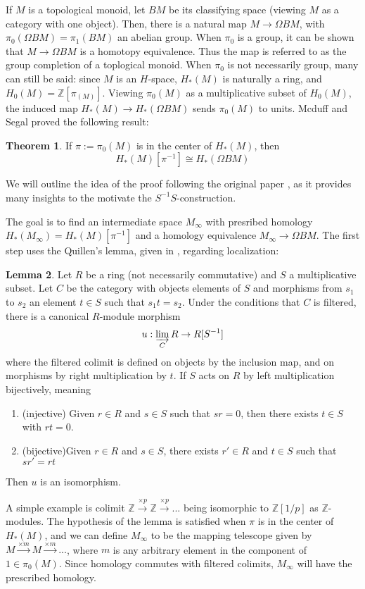 \documentclass{article}
\theoremstyle{definition}
\newtheorem{theorem}{Theorem}[section]
\theoremstyle{definition}
\theoremstyle{definition}
\theoremstyle{definition}
\theoremstyle{definition}
\newtheorem{lemma}[theorem]{Lemma}
\theoremstyle{definition}
\theoremstyle{definition}
\begin{document}
If $M$ is a topological monoid, let $BM$ be its classifying space (viewing $M$ as a category with one object). Then, there is a natural map $M\to \Omega BM$, with $\pi_0(\Omega BM)=\pi_1(BM)$ an abelian group. When $\pi_0$ is a group, it can be shown that $M\to \Omega BM$ is a homotopy equivalence. Thus the map is referred to as the group completion of a toplogical monoid. When $\pi_0$ is not necessarily group, many can still be said: since $M$ is an $H$-space, $H_*(M)$ is naturally a ring, and $H_0(M)=\mathbb{Z}[\pi_(M)]$. Viewing $\pi_0(M)$ as a multiplicative subset of $H_0(M)$, the induced map $H_*(M)\to H_*(\Omega BM)$ sends $\pi_0(M)$ to units. Mcduff and Segal proved the following result:


\begin{tcolorbox}[colback=red!5!white,colframe=red!30!white]
\begin{theorem}
If $\pi:=\pi_0(M)$ is in the center of $H_*(M)$, then 
\[H_*(M)[\pi^{-1}]\cong H_*(\Omega BM)\]
\end{theorem}
\end{tcolorbox}
We will outline the idea of the proof following the original paper \cite{MS}, as it provides many insights to the motivate the $S^{-1}S$-construction.

The goal is to  find an intermediate space $M_{\infty}$ with presribed homology $H_*(M_{\infty})= H_*(M)[\pi^{-1}]$ and a homology equivalence $M_{\infty}\to \Omega BM$. The first step uses the Quillen's lemma, given in \cite{QGc}, regarding localization:

\begin{tcolorbox}
\begin{lemma}
Let $R$ be a ring (not necessarily commutative) and $S$ a multiplicative subset. Let $C$ be the category with objects elements of $S$ and morphisms from $s_1$ to $s_2$ an element $t\in S$ such that $s_1t=s_2$. Under the conditions that $C$ is filtered, there is a canonical $R$-module morphism 
\[u:\varinjlim_{C} R \to R[S^{-1}] \]
where the filtered colimit is defined on objects by the inclusion map, and on morphisms by right multiplication by $t$. If $S$ acts on $R$ by left multiplication bijectively, meaning
\begin{enumerate}
    \item (injective) Given $r\in R$ and $s\in S$ such that $sr=0$, then there exists $t\in S$ with $rt=0$.
    \item (bijective)Given $r\in R$ and $s\in S$, there exists $r'\in R$ and $t\in S$ such that $sr'=rt$
\end{enumerate}
Then $u$ is an isomorphism. 
\end{lemma}
\end{tcolorbox}
A simple example is colimit $\mathbb{Z}\xrightarrow{\times p}\mathbb{Z}\xrightarrow{\times p}...$ being isomorphic to $\mathbb{Z}[1/p]$ as $\mathbb{Z}$-modules. The hypothesis of the lemma is satisfied when $\pi$ is in the center of $H_*(M)$, and we can define $M_{\infty}$ to be the mapping telescope given by $M\xrightarrow{\times m}M\xrightarrow{\times m}...$, where $m$ is any arbitrary element in the component of $1\in \pi_0(M)$. Since homology commutes with filtered colimits, $M_{\infty}$ will have the prescribed homology. 
\end{document}
